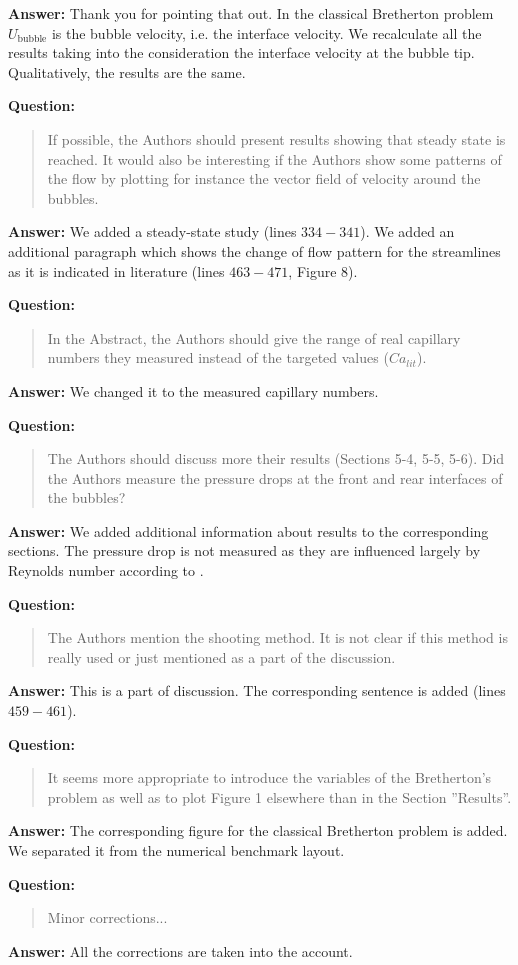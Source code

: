 \documentclass{article}
\begin{document}
\textbf{Answer:} Thank you for pointing that out. In the classical Bretherton problem
$U_{\mathrm{bubble}}$ is the bubble velocity, i.e. the interface velocity. We recalculate all the
results taking into the consideration the interface velocity at the bubble tip. Qualitatively, the
results are the same. 

\textbf{Question:} 
\begin{quotation}
 If possible, the Authors should present results showing that steady state is reached. It would
also
be interesting if the Authors show some patterns of the flow by plotting for instance the vector
ﬁeld
of velocity around the bubbles.
\end{quotation}

\textbf{Answer:} We added a steady-state study (lines $334-341$). We added an additional
paragraph which shows the change of flow pattern for the
streamlines as it is indicated in literature (lines $463-471$, Figure 8).

\textbf{Question:}
\begin{quotation}
In the Abstract, the Authors should give the range of real capillary numbers they measured instead
of the targeted values ($Ca_{lit}$).
\end{quotation}

\textbf{Answer:} We changed it to the measured capillary numbers.

\textbf{Question:} 
\begin{quotation}
The Authors should discuss more their results (Sections 5-4, 5-5, 5-6). Did the Authors measure the
pressure drops at the front and rear interfaces of the bubbles?
\end{quotation}

\textbf{Answer:} We added additional information about results to the corresponding sections. The
pressure drop is not measured as they are influenced largely by Reynolds number according to
\citet{heil-bretherton}.

\textbf{Question:}
\begin{quotation}
The Authors mention the shooting method. It is not clear if this method is really used or just
mentioned as a part of the discussion.
\end{quotation}

\textbf{Answer:} This is a part of discussion. The corresponding
sentence is added (lines $459-461$).

\textbf{Question:}
\begin{quotation}
It seems more appropriate to introduce the variables of the Bretherton’s problem as well as to plot
Figure 1 elsewhere than in the Section ”Results”.
\end{quotation}

\textbf{Answer:} The corresponding figure for the classical Bretherton problem is added. We
separated it from the numerical benchmark layout.

\textbf{Question:}
\begin{quotation}
Minor corrections...
\end{quotation}

\textbf{Answer:} All the corrections are taken into the account.



\end{document}
